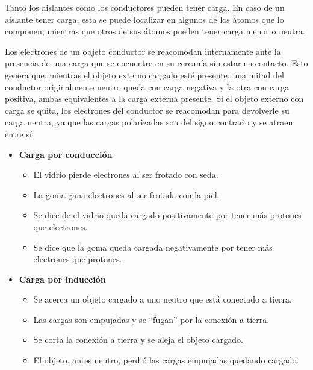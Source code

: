\documentclass[a5paper,12pt,twoside]{book}
\begin{document}
Tanto los aislantes como los conductores pueden tener carga.
En caso de un aislante tener carga, esta se puede localizar en algunos de los átomos que lo componen, mientras que otros de sus átomos pueden tener carga menor o neutra.


Los electrones de un objeto conductor se reacomodan internamente ante la presencia de una carga que se encuentre en su cercanía sin estar en contacto.
Esto genera que, mientras el objeto externo cargado esté presente, una mitad del conductor originalmente neutro queda con carga negativa y la otra con carga positiva, ambas equivalentes a la carga externa presente.
Si el objeto externo con carga se quita, los electrones del conductor se reacomodan para devolverle su carga neutra, ya que las cargas polarizadas son del signo contrario y se atraen entre sí.

\begin{itemize}
    \item \textbf{Carga por conducción}
    
    \begin{itemize}
        \item El vidrio pierde electrones al ser frotado con seda.
        \item La goma gana electrones al ser frotada con la piel.
        \item Se dice de el vidrio queda cargado positivamente por tener más protones que electrones.
        \item Se dice que la goma queda cargada negativamente por tener más electrones que protones.
    \end{itemize}

    \item \textbf{Carga por inducción}
    
    \begin{itemize}
        \item Se acerca un objeto cargado a uno neutro que está conectado a tierra.
        \item Las cargas son empujadas y se ``fugan'' por la conexión a tierra.
        \item Se corta la conexión a tierra y se aleja el objeto cargado.
        \item El objeto, antes neutro, perdió las cargas empujadas quedando cargado.
    \end{itemize}

    \begin{center}
        \def\svgwidth{\linewidth}
        
    \end{center}
\end{itemize}
\end{document}
